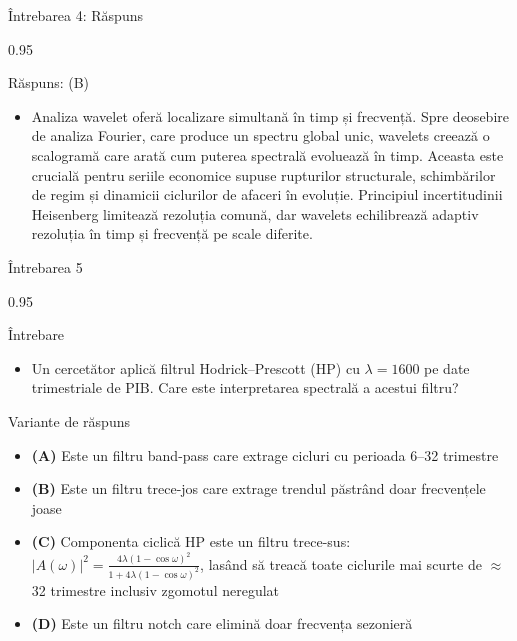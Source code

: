 \documentclass[9pt, aspectratio=169, t]{beamer}
\begin{document}
\begin{frame}{Întrebarea 4: Răspuns}
    \begin{cminipage}{0.95\textwidth}
    \vspace{-0.3cm}
    {\small
    \begin{exampleblock}{Răspuns: (B)}
    \begin{itemize}\setlength{\itemsep}{0pt}
        \item Analiza wavelet oferă localizare simultană în timp și frecvență. Spre deosebire de analiza Fourier, care produce un spectru global unic, wavelets creează o scalogramă care arată cum puterea spectrală evoluează în timp. Aceasta este crucială pentru seriile economice supuse rupturilor structurale, schimbărilor de regim și dinamicii ciclurilor de afaceri în evoluție. Principiul incertitudinii Heisenberg limitează rezoluția comună, dar wavelets echilibrează adaptiv rezoluția în timp și frecvență pe scale diferite.
    \end{itemize}
    \end{exampleblock}
    }
    \hfill{}
    \end{cminipage}
\end{frame}

\begin{frame}{Întrebarea 5}
    \begin{cminipage}{0.95\textwidth}
    \begin{alertblock}{Întrebare}
        \begin{itemize}\setlength{\itemsep}{0pt}
            \item Un cercetător aplică filtrul Hodrick--Prescott (HP) cu $\lambda = 1600$ pe date trimestriale de PIB. Care este interpretarea spectrală a acestui filtru?
        \end{itemize}
    \end{alertblock}

    \vspace{0.3cm}

    \begin{block}{Variante de răspuns}
        \begin{itemize}\setlength{\itemsep}{2pt}
            \item \textcolor{MainBlue}{\textbf{(A)}} Este un filtru band-pass care extrage cicluri cu perioada 6--32 trimestre
            \item \textcolor{MainBlue}{\textbf{(B)}} Este un filtru trece-jos care extrage trendul păstrând doar frecvențele joase
            \item \textcolor{MainBlue}{\textbf{(C)}} Componenta ciclică HP este un filtru trece-sus: $|A(\omega)|^2 = \frac{4\lambda(1-\cos\omega)^2}{1+4\lambda(1-\cos\omega)^2}$, lasând să treacă toate ciclurile mai scurte de $\approx$ 32 trimestre inclusiv zgomotul neregulat
            \item \textcolor{MainBlue}{\textbf{(D)}} Este un filtru notch care elimină doar frecvența sezonieră
        \end{itemize}
    \end{block}
    \end{cminipage}
\end{frame}
\end{document}
